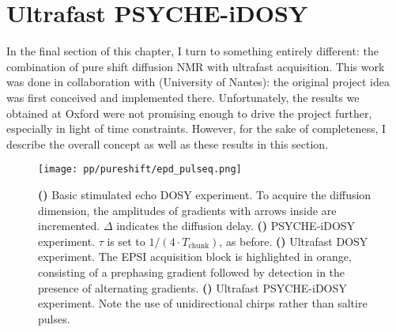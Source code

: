 \section{Ultrafast PSYCHE-iDOSY}
\label{sec:pureshift__epsidosy}

In the final section of this chapter, I turn to something entirely different: the combination of pure shift diffusion NMR with ultrafast acquisition.
This work was done in collaboration with \JND{} (University of Nantes): the original project idea was first conceived and implemented there.
Unfortunately, the results we obtained at Oxford were not promising enough to drive the project further, especially in light of time constraints.
However, for the sake of completeness, I describe the overall concept as well as these results in this section.

\begin{figure}[htb]
    \centering
    \texttt{[image: pp/pureshift/epd\_pulseq.png]}%
    {\label{fig:epd_pulseq_stedosy}}%
    {\label{fig:epd_pulseq_psychedosy}}%
    {\label{fig:epd_pulseq_epsidosy}}%
    {\label{fig:epd_pulseq_epsipsychedosy}}%
    \caption[EPSI PSYCHE-iDOSY and associated pulse sequences]{
        \textbf{()} Basic stimulated echo DOSY experiment.
        To acquire the diffusion dimension, the amplitudes of gradients with arrows inside are incremented.
        $\Delta$ indicates the diffusion delay.
        \textbf{()} PSYCHE-iDOSY experiment. $\tau$ is set to $1/(4 \cdot T_\text{chunk})$, as before.
        \textbf{()} Ultrafast DOSY experiment. The EPSI acquisition block is highlighted in orange, consisting of a prephasing gradient followed by detection in the presence of alternating gradients.
        \textbf{()} Ultrafast PSYCHE-iDOSY experiment. Note the use of unidirectional chirps rather than saltire pulses.
    }
    \label{fig:epd_pulseq}
\end{figure}

